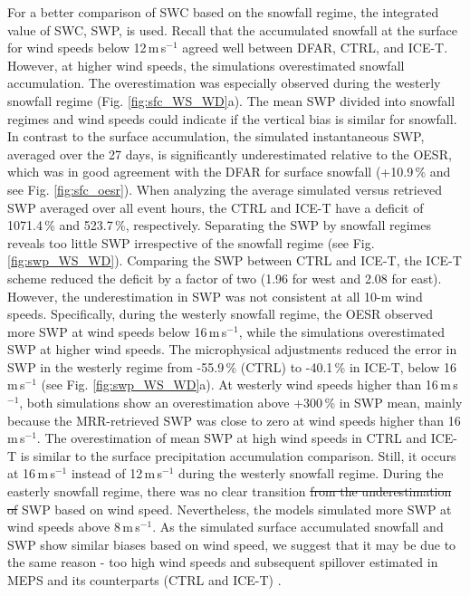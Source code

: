 \documentclass{ametsocV5}
\providecommand{\DIFadd}[1]{{\protect\color{blue}\uwave{#1}}} %
\providecommand{\DIFdel}[1]{{\protect\color{red}\sout{#1}}}                      %
\providecommand{\DIFaddbegin}{} %
\providecommand{\DIFaddend}{} %
\providecommand{\DIFdelbegin}{} %
\providecommand{\DIFdelend}{} %
\newcommand{\DIFscaledelfig}{0.5}
\newlength{\DIFdelgraphicswidth} %
\newlength{\DIFdelgraphicsheight} %
\newcommand{\DIFaddincludegraphics}[2][]{{\color{blue}\fbox{\DIFOincludegraphics[#1]{#2}}}} %
\newcommand{\DIFdelincludegraphics}[2][]{%
\sbox{\DIFdelgraphicsbox}{\DIFOincludegraphics[#1]{#2}}%
\settoboxwidth{\DIFdelgraphicswidth}{\DIFdelgraphicsbox} %
\settoboxtotalheight{\DIFdelgraphicsheight}{\DIFdelgraphicsbox} %
\scalebox{\DIFscaledelfig}{%
\parbox[b]{\DIFdelgraphicswidth}{\usebox{\DIFdelgraphicsbox}\\[-\baselineskip] \rule{\DIFdelgraphicswidth}{0em}}\llap{\resizebox{\DIFdelgraphicswidth}{\DIFdelgraphicsheight}{%
\setlength{\unitlength}{\DIFdelgraphicswidth}%
\begin{picture}(1,1)%
\thicklines\linethickness{2pt} %
{\color[rgb]{1,0,0}\put(0,0){\framebox(1,1){}}}%
{\color[rgb]{1,0,0}\put(0,0){\line( 1,1){1}}}%
{\color[rgb]{1,0,0}\put(0,1){\line(1,-1){1}}}%
\end{picture}%
}\hspace*{3pt}}} %
} %
\DeclareRobustCommand{\DIFaddbegin}{\DIFOaddbegin \let\includegraphics\DIFaddincludegraphics} %
\DeclareRobustCommand{\DIFaddend}{\DIFOaddend \let\includegraphics\DIFOincludegraphics} %
\DeclareRobustCommand{\DIFdelbegin}{\DIFOdelbegin \let\includegraphics\DIFdelincludegraphics} %
\DeclareRobustCommand{\DIFdelend}{\DIFOaddend \let\includegraphics\DIFOincludegraphics} %
\begin{document}
		For a better comparison of SWC based on the snowfall regime, the integrated value of SWC, SWP, is used. Recall that the accumulated snowfall at the surface for wind speeds below 12\,m\,s$^{-1}$ agreed well between DFAR, CTRL, and ICE-T. However, at higher wind speeds, the simulations overestimated snowfall accumulation. The overestimation was especially observed during the westerly snowfall regime (Fig. \ref{fig:sfc_WS_WD}a). The mean SWP divided into snowfall regimes and wind speeds could indicate if the vertical bias is similar for snowfall. In contrast to the surface accumulation, the simulated instantaneous SWP, averaged over the 27 days, is significantly underestimated relative to the OESR, which was in good agreement with the DFAR for surface snowfall (+10.9\,\% and see Fig. \ref{fig:sfc_oesr}). When analyzing the average simulated versus retrieved SWP averaged over all event hours, the CTRL and ICE-T have a deficit of 1071.4\,\% and 523.7\,\%, respectively. Separating the SWP by snowfall regimes reveals too little SWP irrespective of the snowfall regime (see Fig. \ref{fig:swp_WS_WD}). Comparing the SWP between CTRL and ICE-T, the ICE-T scheme reduced the deficit by a factor of two (1.96 for west and 2.08 for east). However, the underestimation in SWP was not consistent at all 10-m wind speeds. Specifically, during the westerly snowfall regime, the OESR observed more SWP at wind speeds below 16\,m\,s$^{-1}$, while the simulations overestimated SWP at higher wind speeds. The microphysical adjustments reduced the error in SWP in the westerly regime from -55.9\,\% (CTRL) to -40.1\,\% in ICE-T, below 16\,m\,s$^{-1}$ (see Fig. \ref{fig:swp_WS_WD}a). At westerly wind speeds higher than 16\,m\,s$^{-1}$, both simulations show an overestimation above +300\,\% in SWP mean, mainly because the MRR-retrieved SWP was close to zero at wind speeds higher than 16\,m\,s$^{-1}$. The overestimation of mean SWP at high wind speeds in CTRL and ICE-T is similar to the surface precipitation accumulation comparison. Still, it occurs at 16\,m\,s$^{-1}$ instead of 12\,m\,s$^{-1}$ during the westerly snowfall regime. During the easterly snowfall regime, there was no clear transition \DIFdelbegin \DIFdel{from the underestimation of }\DIFdelend \DIFaddbegin \DIFadd{of underestimating }\DIFaddend SWP based on wind speed. Nevertheless, the models simulated more SWP at wind speeds above 8\,m\,s$^{-1}$. As the simulated surface accumulated snowfall and SWP show similar biases based on wind speed, we suggest that it may be due to the same reason - too high wind speeds and subsequent spillover estimated in MEPS and its counterparts (CTRL and ICE-T) \citep{muller_arome-metcoop:_2017,frogner_convection-permitting_2019}. 
\end{document}
